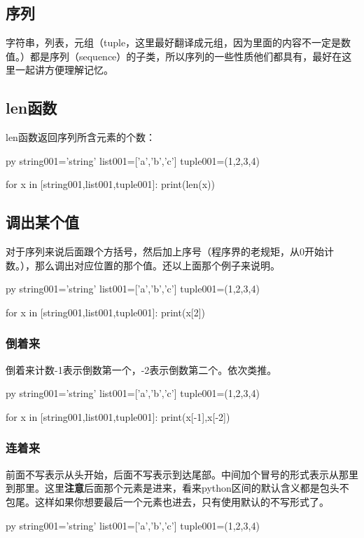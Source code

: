 \documentclass[12pt,oneside]{book}
\begin{document}
\begin{common-format}
\section{序列}
字符串，列表，元组（tuple，这里最好翻译成元组，因为里面的内容不一定是数值。）都是序列（sequence）的子类，所以序列的一些性质他们都具有，最好在这里一起讲方便理解记忆。

\subsection{len函数}
len函数返回序列所含元素的个数：
\begin{xverbatim}[129]{py}
string001='string'
list001=['a','b','c']
tuple001=(1,2,3,4)

for x in [string001,list001,tuple001]:
    print(len(x))
\end{xverbatim}


\subsection{调出某个值}
对于序列来说后面跟个方括号，然后加上序号（程序界的老规矩，从0开始计数。），那么调出对应位置的那个值。还以上面那个例子来说明。
\begin{xverbatim}[129]{py}
string001='string'
list001=['a','b','c']
tuple001=(1,2,3,4)

for x in [string001,list001,tuple001]:
    print(x[2])
\end{xverbatim}

\subsubsection{倒着来}
倒着来计数-1表示倒数第一个，-2表示倒数第二个。依次类推。
\begin{xverbatim}[129]{py}
string001='string'
list001=['a','b','c']
tuple001=(1,2,3,4)

for x in [string001,list001,tuple001]:
    print(x[-1],x[-2])
\end{xverbatim}

\subsubsection{连着来}
\label{sec:序列连着来}
前面不写表示从头开始，后面不写表示到达尾部。中间加个冒号的形式表示从那里到那里。这里\textbf{注意}后面那个元素是进来，看来python区间的默认含义都是包头不包尾。这样如果你想要最后一个元素也进去，只有使用默认的不写形式了。
\begin{xverbatim}[129]{py}
string001='string'
list001=['a','b','c']
tuple001=(1,2,3,4)


\end{xverbatim}
\end{common-format}
\end{document}
